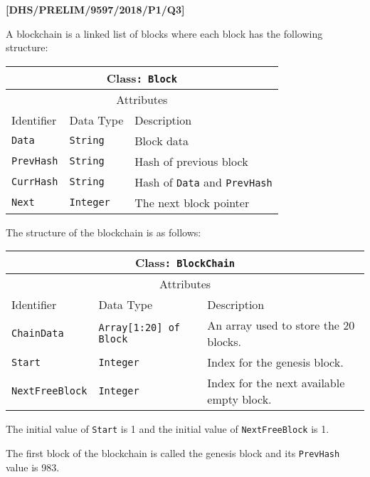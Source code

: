 \item \textbf{{[}DHS/PRELIM/9597/2018/P1/Q3{]} }

A blockchain is a linked list of blocks where each block has the following
structure:
\begin{center}
\begin{tabular}{|l|l|l|}
\hline 
\multicolumn{3}{|c|}{Class\texttt{: Block}}\tabularnewline
\hline 
\multicolumn{3}{|c|}{Attributes}\tabularnewline
\hline 
\texttt{\hspace{0.01\columnwidth}}Identifier & \texttt{\hspace{0.01\columnwidth}}Data Type & \texttt{\hspace{0.05\columnwidth}}Description\tabularnewline
\hline 
\texttt{Data} & \texttt{String} & Block data\tabularnewline
\hline 
\texttt{PrevHash} & \texttt{String} & Hash of previous block\tabularnewline
\hline 
\texttt{CurrHash} & \texttt{String} & Hash of \texttt{Data} and \texttt{PrevHash}\tabularnewline
\hline 
\texttt{Next} & \texttt{Integer} & The next block pointer\tabularnewline
\hline 
\end{tabular}
\par\end{center}

The structure of the blockchain is as follows:
\begin{center}
\begin{tabular}{|l|l|l|}
\hline 
\multicolumn{3}{|c|}{Class\texttt{: BlockChain}}\tabularnewline
\hline 
\multicolumn{3}{|c|}{Attributes}\tabularnewline
\hline 
\texttt{\hspace{0.01\columnwidth}}Identifier & \texttt{\hspace{0.01\columnwidth}}Data Type & \texttt{\hspace{0.05\columnwidth}}Description\tabularnewline
\hline 
\texttt{ChainData} & \texttt{Array{[}1:20{]} of Block} & An array used to store the 20 blocks.\tabularnewline
\hline 
\texttt{Start} & \texttt{Integer} & Index for the genesis block.\tabularnewline
\hline 
\texttt{NextFreeBlock} & \texttt{Integer} & Index for the next available empty block.\tabularnewline
\hline 
\end{tabular}
\par\end{center}

The initial value of \texttt{Start} is 1 and the initial value of
\texttt{NextFreeBlock} is 1.

The first block of the blockchain is called the genesis block and
its \texttt{PrevHash} value is 983.

